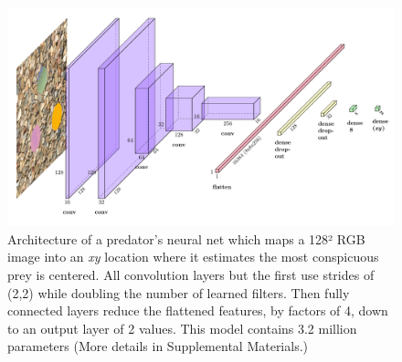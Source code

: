 \documentclass[letterpaper]{article}
\begin{document}

\begin{figure}
    \includegraphics[width=\columnwidth]{predator_cnn.pdf}
    \caption{Architecture of a predator's neural net which maps a 128² RGB image into an \textit{xy} location where it estimates the most conspicuous prey is centered. All convolution layers but the first use strides of (2,2) while doubling the number of learned filters. Then fully connected layers reduce the flattened features, by factors of 4, down to an output layer of 2 values. This model contains 3.2 million parameters (More details in Supplemental Materials.)}
    \label{fig:predator_cnn}
\end{figure}

\end{document}
